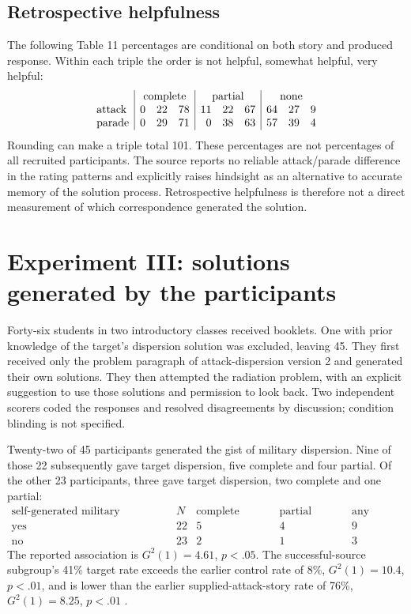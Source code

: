 \subsection{Retrospective helpfulness}

The following Table 11 percentages are conditional
on both story and produced response. Within each
triple the order is not helpful, somewhat helpful,
very helpful:
\[
\begin{array}{l|rrr|rrr|rrr}
 &\multicolumn{3}{c|}{\text{complete}}
 &\multicolumn{3}{c|}{\text{partial}}
 &\multicolumn{3}{c}{\text{none}}\\
 \text{attack}&0&22&78&11&22&67&64&27&9\\
 \text{parade}&0&29&71&0&38&63&57&39&4
\end{array}
\]
Rounding can make a triple total 101. These percentages
are not percentages of all recruited participants.
The source reports no reliable attack/parade difference
in the rating patterns and explicitly raises hindsight
as an alternative to accurate memory of the solution
process. Retrospective helpfulness is therefore not a
direct measurement of which correspondence generated
the solution.

\section{Experiment III: solutions generated by the participants}
\label{sec:p19-analogy-experiment-three}

Forty-six students in two introductory classes received
booklets. One with prior knowledge of the target's
dispersion solution was excluded, leaving 45.
They first received only the problem paragraph of
attack-dispersion version 2 and generated their own
solutions. They then attempted the radiation problem,
with an explicit suggestion to use those solutions
and permission to look back. Two independent scorers
coded the responses and resolved disagreements by
discussion; condition blinding is not specified.

Twenty-two of 45 participants generated the gist of
military dispersion. Nine of those 22 subsequently
gave target dispersion, five complete and four partial.
Of the other 23 participants, three gave target
dispersion, two complete and one partial:
\[
\begin{array}{l|r|rr|r}
 \text{self-generated military dispersion}&N&
    \text{complete target}&\text{partial target}&\text{any target}\\ \hline
 \text{yes}&22&5&4&9\\
 \text{no}&23&2&1&3
\end{array}
\]
The reported association is \(G^2(1)=4.61\),
\(p<.05\). The successful-source subgroup's
41\% target rate exceeds the earlier control
rate of 8\%, \(G^2(1)=10.4\), \(p<.01\),
and is lower than the earlier supplied-attack-story
rate of 76\%, \(G^2(1)=8.25\), \(p<.01\)
\cite[pp.~337--340]{GickHolyoak1980AnalogicalProblemSolving}.

